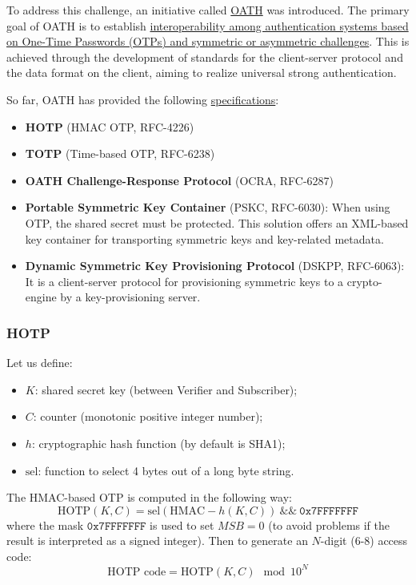To address this challenge, an initiative called \href{http://www.openauthentication.org/}{OATH} was introduced. The primary goal of OATH is to establish \ul{interoperability among authentication systems based on One-Time Passwords (OTPs) and symmetric or asymmetric challenges}. This is achieved through the development of standards for the client-server protocol and the data format on the client, aiming to realize universal strong authentication.

So far, OATH has provided the following \href{http://www.openauthentication.org/specifications}{specifications}:
\begin{itemize}
  \item \textbf{HOTP} (HMAC OTP, RFC-4226)
  \item \textbf{TOTP} (Time-based OTP, RFC-6238)
  \item \textbf{OATH Challenge-Response Protocol} (OCRA, RFC-6287)
  \item \textbf{Portable Symmetric Key Container} (PSKC, RFC-6030): When using OTP, the shared secret must be protected. This solution offers an XML-based key container for transporting symmetric keys and key-related metadata.
  \item \textbf{Dynamic Symmetric Key Provisioning Protocol} (DSKPP, RFC-6063): It is a client-server protocol for provisioning symmetric keys to a crypto-engine by a key-provisioning server.
\end{itemize}

\subsubsection{HOTP}

Let us define:
\begin{itemize}
  \item \(K\): shared secret key (between Verifier and Subscriber);
  \item \(C\): counter (monotonic positive integer number);
  \item \(h\): cryptographic hash function (by default is SHA1);
  \item \(\text{sel}\): function to select 4 bytes out of a long byte string.
\end{itemize}

The HMAC-based OTP is computed in the following way:
\[
  \text{HOTP}(K, C) = \text{sel}(\text{HMAC}-h(K, C)) \ \&\& \ \mathtt{0x7FFFFFFF}
\]
where the mask \(\mathtt{0x7FFFFFFF}\) is used to set \(MSB=0\) (to avoid problems if the result is interpreted as a signed integer). Then to generate an \(N\)-digit (6-8) access code:
\[
  \text{HOTP code} = \text{HOTP}(K, C) \mod 10^N
\]

